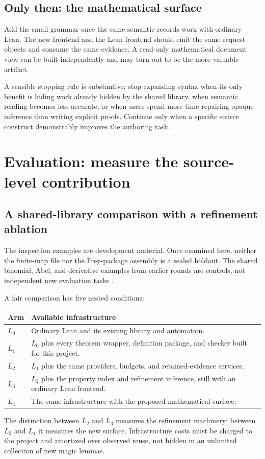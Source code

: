 \documentclass[11pt,letterpaper]{article}
\theoremstyle{remark}
\begin{document}
\subsection{Only then: the mathematical surface}
Add the small grammar once the same semantic records work with ordinary Lean.
The new frontend and the Lean frontend should emit the same request objects
and consume the same evidence. A read-only mathematical document view can be
built independently and may turn out to be the more valuable artifact.

A sensible stopping rule is substantive: stop expanding syntax when its only
benefit is hiding work already hidden by the shared library, when semantic
reading becomes less accurate, or when users spend more time repairing opaque
inference than writing explicit proofs. Continue only when a specific source
construct demonstrably improves the authoring task.

\section{Evaluation: measure the source-level contribution}\label{sec:evaluation}

\subsection{A shared-library comparison with a refinement ablation}
The inspection examples are development material. Once examined here, neither
the finite-map file nor the Frey-package assembly is a sealed holdout. The
shared binomial, Abel, and derivative examples from earlier rounds are controls,
not independent new evaluation tasks \cite{syn,workbenches}.

A fair comparison has five nested conditions:
\begin{center}\small
\begin{tabularx}{\textwidth}{@{}P{.45in}Y@{}}
\toprule
Arm & Available infrastructure\\
\midrule
$L_0$ & Ordinary Lean and its existing library and automation.\\
$L_1$ & $L_0$ plus every theorem wrapper, definition package, and checker built
for this project.\\
$L_2$ & $L_1$ plus the same providers, budgets, and retained-evidence services.\\
$L_3$ & $L_2$ plus the property index and refinement inference, still with an
ordinary Lean frontend.\\
$L_4$ & The same infrastructure with the proposed mathematical surface.\\
\bottomrule
\end{tabularx}
\end{center}
The distinction between $L_2$ and $L_3$ measures the refinement machinery;
between $L_3$ and $L_4$ it measures the new surface. Infrastructure costs must
be charged to the project and amortized over observed reuse, not hidden in an
unlimited collection of new magic lemmas.
\end{document}
